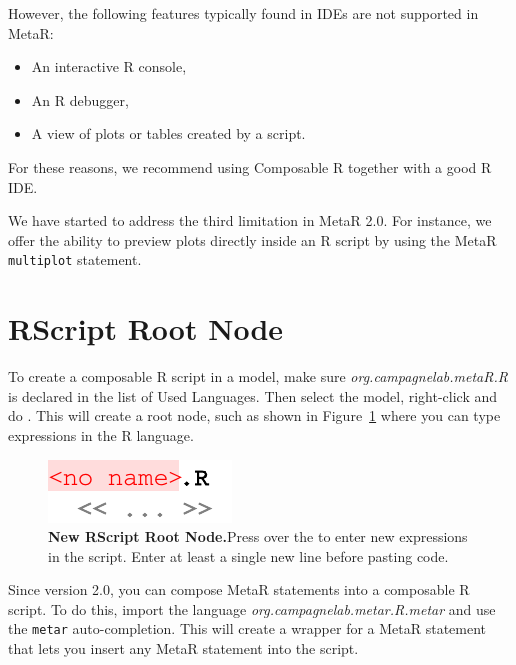\noindent{}However, the following features typically found in IDEs are not supported in MetaR:

\begin{itemize}
  \item An interactive R console,
  \item An R debugger,
  \item A view of plots or tables created by a script. 
\end{itemize}

For these reasons, we recommend using Composable R together with a good R IDE.

\begin{remark}
We have started to address the third limitation in MetaR 2.0. For instance, we offer the ability to preview plots directly inside an R script by using the MetaR \texttt{multiplot} statement. 
\end{remark}

\section{RScript Root Node}
To create a composable R script in a model, make sure \textit{org.campagnelab.metaR.R} is declared in the list of Used Languages. Then select the model, right-click and do . This will create a root node, such as shown in Figure~\ref{fig:NewRScriptRootNode} where you can type expressions in the R language. 

\begin{figure}[tbhp]
  \centering
  \includegraphics[width=\figWidthTiny]{figures/NewRScriptRootNode.pdf}
\caption[New RScript Root Node]{\textbf{New RScript Root Node.}Press \keys{\return} over the \mpsplaceholder{} to enter new expressions in the script. Enter at least a single new line before pasting code.}
\label{fig:NewRScriptRootNode}
\end{figure}

\begin{remark}
Since version 2.0, you can compose MetaR statements into a composable R script. To do this, import the language \textit{org.campagnelab.metar.R.metar} and use the \texttt{metar} auto-completion. This will create a wrapper for a MetaR statement that lets you insert any MetaR statement into the script. 
\end{remark}

